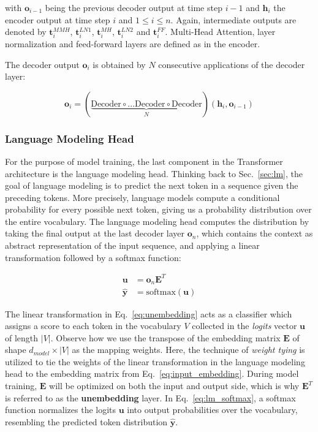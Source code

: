 with $\bm{o}_{i-1}$ being the previous decoder output at time step $i-1$ and
$\bm{h}_i$ the encoder output at time step $i$ and $1 \leq i \leq n$. Again,
intermediate outputs are denoted by $\bm{t}_i^{MMH}$, $\bm{t}_i^{LN1}$,
$\bm{t}_i^{MH}$, $\bm{t}_i^{LN2}$ and $\bm{t}_i^{FF}$. Multi-Head Attention,
layer normalization and feed-forward layers are defined as in the encoder.

The decoder output $\bm{o}_i$ is obtained by $N$ consecutive applications of the
decoder layer:

\begin{equation}
    \bm{o}_i = \left(\underbrace{\text{Decoder} \circ \ldots \text{Decoder} \circ \text{Decoder}}_{N}\right)(\bm{h}_i, \bm{o}_{i-1})
\end{equation}

\subsubsection{Language Modeling Head}
For the purpose of model training, the last component in the Transformer
architecture is the language modeling head. Thinking back to Sec.~\ref{sec:lm},
the goal of language modeling is to predict the next token in a sequence given
the preceding tokens. More precisely, language models compute a conditional
probability for every possible next token, giving us a probability distribution
over the entire vocabulary. The language modeling head computes the distribution
by taking the final output at the last decoder layer $\bm{o}_n$, which contains
the context as abstract representation of the input sequence, and applying a
linear transformation followed by a softmax function:

\begin{align}
    \bm{u} &= \bm{o}_n \bm{E}^T \label{eq:unembedding} \\
    \bm{\hat{y}} &= \text{softmax}(\bm{u}) \label{eq:lm_softmax}
\end{align}

The linear transformation in Eq.~\ref{eq:unembedding} acts as a classifier which
assigns a score to each token in the vocabulary $V$ collected in the
\textit{logits} vector $\bm{u}$ of length $|V|$. Observe how we use the
transpose of the embedding matrix $\bm{E}$ of shape $d_{model} \times |V|$ as
the mapping weights. Here, the technique of \textit{weight tying} is utilized to
tie the weights of the linear transformation in the language modeling head to
the embedding matrix from Eq.~\ref{eq:input_embedding}. During model training,
$\bm{E}$ will be optimized on both the input and output side, which is why
$\bm{E}^T$ is referred to as the \textbf{unembedding} layer. In
Eq.~\ref{eq:lm_softmax}, a softmax function normalizes the logits $\bm{u}$ into
output probabilities over the vocabulary, resembling the predicted token
distribution $\hat{\bm{y}}$. 


